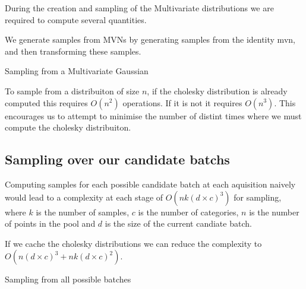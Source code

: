 \documentclass[12pt, a4paper]{report}
\theoremstyle{definition}
\begin{document}
During the creation and sampling of the Multivariate distributions we are required to compute several quantities.

We generate samples from MVNs by generating samples from the identity mvn, and then transforming these samples.

\begin{algorithm}[H]
    \SetAlgoLined
    \caption{Sampling from a Multivariate Gaussian}
\end{algorithm}

To sample from a distribuiton of size $n$, if the cholesky distribution is already computed this requires $O(n^2)$ operations. If it is not it requires $O(n^3)$. This encourages us to attempt to minimise the number of distint times where we must compute the cholesky distribuiton.


\subsection{Sampling over our candidate batchs}

Computing samples for each possible candidate batch at each aquisition naively would lead to a complexity at each stage of $O\left(n k (d \times c)^3 \right)$ for sampling, where $k$ is the number of samples, $c$ is the number of categories, $n$ is the number of points in the pool and $d$ is the size of the current candiate batch.

If we cache the cholesky distributions we can reduce the complexity to $O(n (d \times c)^3  + n k (d \times c)^2)$.

\begin{algorithm}[H]
    \SetAlgoLined
     \caption{Sampling from all possible batches}
\end{algorithm}
\end{document}
